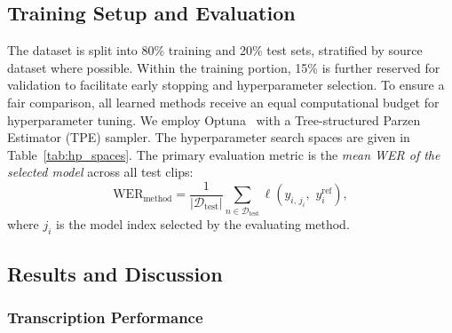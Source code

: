 \documentclass[journal]{IEEEtran}
\begin{document}
    \subsection{Training Setup and Evaluation}
    \label{subsec:training_setup}

    The dataset is split into 80\% training and 20\% test sets, stratified by
    source dataset where possible. Within the training portion, 15\% is further reserved
    for validation to facilitate early stopping and hyperparameter selection. To
    ensure a fair comparison, all learned methods receive an equal computational
    budget for hyperparameter tuning. We employ Optuna~\cite{akiba2019optuna}
    with a Tree-structured Parzen Estimator (TPE) sampler. The hyperparameter search
    spaces are given in Table~\ref{tab:hp_spaces}. The primary evaluation metric
    is the \emph{mean WER of the selected model} across all test clips:
    \begin{equation}
        \text{WER}_{\text{method}}= \frac{1}{|\mathcal{D}_{\text{test}}|}\sum_{n
        \in \mathcal{D}_{\text{test}}}\ell\!\left(y_{i,\, j_i},\, \,y_i^{\mathrm{ref}}\right),
    \end{equation}
    where $j_{i}$ is the model index selected by the evaluating method.

    

    \subsection{Results and Discussion}
    \label{subsec:results_discussion}

    \subsubsection{Transcription Performance}
\end{document}
